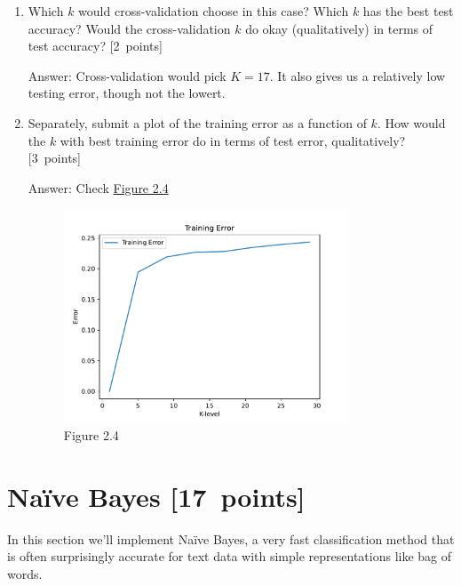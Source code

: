 \documentclass{article}
\newcommand{\blu}[1]{{\textcolor{blu}{#1}}}
\newenvironment{answer}{\par\begingroup\color{gre}Answer: }{\endgroup}
\let\ask\blu
\newcommand\pts[1]{\textcolor{pointscolour}{[#1~points]}}
\begin{document}
\begin{enumerate}
        \item Which $k$ would cross-validation choose in this case? Which $k$ has the best test accuracy? Would the cross-validation $k$ do okay (qualitatively) in terms of test accuracy? \pts{2}
        
        \begin{answer}
            Cross-validation would pick $K = 17$. It also gives us a relatively low testing error, though not the lowert.
        \end{answer}


        \item Separately, \ask{submit a plot of the training error as a function of $k$. How would the $k$ with best training error do in terms of test error, qualitatively?} \pts{3}
        \begin{answer}
            Check \hyperref[fig2.4]{Figure 2.4}
        \end{answer}
        
        \begin{figure}[!htbp]
            \label{fig2.4}
            \centering
            \includegraphics[width = 0.8\textwidth]{figs/TrainingError.pdf}
            \caption{Figure 2.4}
        \end{figure}
    \end{enumerate}



    \clearpage
    \section{Na\"ive Bayes \pts{17}}

    In this section we'll implement Na\"ive Bayes, a very fast classification method that is often surprisingly accurate for text data with simple representations like bag of words.
\end{document}
